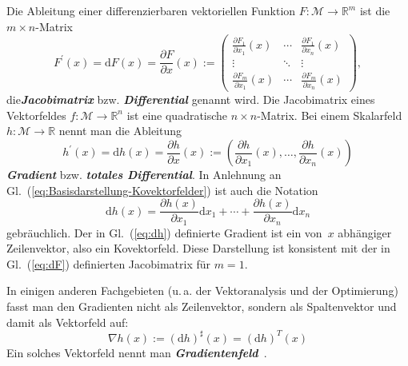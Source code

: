 Die Ableitung einer differenzierbaren vektoriellen
Funktion $F:\mathcal{M}\to{\mathbb{R}}^{m}$ ist die $m\times n$-Matrix
\begin{equation}
F^{\prime}(x)={\mathrm{d}} F(x)=\frac{\partial F}{\partial x}(x):=\left(\begin{array}{ccc}
\frac{\partial F_{1}}{\partial x_{1}}(x) & \cdots & \frac{\partial F_{1}}{\partial x_{n}}(x)\\
\vdots & \ddots & \vdots\\
\frac{\partial F_{m}}{\partial x_{1}}(x) & \cdots & \frac{\partial F_{m}}{\partial x_{n}}(x)
\end{array}\right),\label{eq:dF}
\end{equation}
die\textbf{\em  Jacobimatrix} bzw. \textbf{\em Differential}
genannt wird. Die Jacobimatrix eines Vektor\-feldes $f:\mathcal{M}\to{\mathbb{R}}^{n}$
ist eine quadratische $n\times n$-Matrix.
Bei einem Skalarfeld $h:\mathcal{M}\to{\mathbb{R}}$
nennt man die Ableitung
\begin{equation}
h^{\prime}(x)={\mathrm{d}} h(x)=\frac{\partial h}{\partial x}(x):=\left(\frac{\partial h}{\partial x_{1}}(x),\ldots,\frac{\partial h}{\partial x_{n}}(x)\right)\label{eq:dh}
\end{equation}
\textbf{\em Gradient} bzw. \textbf{\em totales Differential}.
In Anlehnung an Gl.~(\ref{eq:Basisdarstellung-Kovektorfelder}) ist
auch die Notation
\[
{\mathrm{d}} h(x)=\frac{\partial h(x)}{\partial x_{1}}{\mathrm{d}} x_{1}+\cdots+\frac{\partial h(x)}{\partial x_{n}}{\mathrm{d}} x_{n}
\]
gebräuchlich.
Der in Gl.~(\ref{eq:dh}) definierte Gradient ist ein
von~$x$ abhängiger Zeilenvektor, also ein Kovektorfeld. Diese Darstellung
ist konsistent mit der in Gl.~(\ref{eq:dF}) definierten Jacobimatrix
für $m=1$.
\begin{remark}
[Gradientenfeld]\label{rem:Gradient-als-Vektorfeld}In einigen anderen
Fachgebieten (u.\,a. der Vektoranalysis und der Optimierung) fasst
man den Gradienten nicht als Zeilenvektor, sondern als Spaltenvektor
und damit als Vektorfeld auf:
\[
\nabla h(x):=({\mathrm{d}} h)^{\sharp}(x)=({\mathrm{d}} h)^{T}(x)
\]
Ein solches Vektorfeld nennt man \textbf{\em Gradientenfeld}~\cite{koenigsberger2-2004,knauf2012}.
\end{remark}
